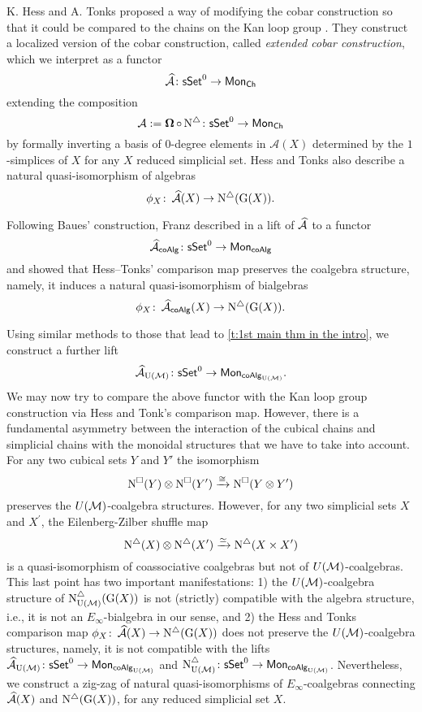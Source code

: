 K. Hess and A. Tonks proposed a way of modifying the cobar construction so that it could be compared to the chains on the Kan loop group \cite{hess2010cobar}.
They construct a localized version of the cobar construction, called \textit{extended cobar construction}, which we interpret as a functor
\[
\operatorname{\mathcal{\widehat{A}}} \colon \mathsf{sSet}^0 \to \mathsf{Mon}_{\mathsf{Ch}}
\]
extending the composition 
\[
\operatorname{\mathcal{A}}:= \operatorname{\mathbf{\Omega}} \circ \operatorname{N^{\triangle}} \colon \mathsf{sSet}^0 \to \mathsf{Mon}_{\mathsf{Ch}}
\]
by formally inverting a basis of $0$-degree elements in $\mathcal{A}(X)$ determined by the $1$-simplices of $X$ for any $X$ reduced simplicial set.
Hess and Tonks also describe a natural quasi-isomorphism of algebras
\begin{equation*}
\phi_X \colon \operatorname{\mathcal{\widehat{A}}}(X) \to \operatorname{N^{\triangle}}(\operatorname{G}(X)).
\end{equation*}


Following Baues’ construction, Franz described in \cite{franz2020szczarba} a lift of $\operatorname{\mathcal{\widehat{A}}}$ to a functor
\begin{equation*}
\operatorname{\mathcal{\widehat{A}}}_{\mathsf{coAlg}} \colon \mathsf{sSet}^0 \to \mathsf{Mon}_{\mathsf{coAlg}}
\end{equation*}
and showed that Hess--Tonks' comparison map preserves the coalgebra structure, namely, it induces a natural quasi-isomorphism of bialgebras
\begin{equation*}
\phi_X \colon \operatorname{\mathcal{\widehat{A}}}_{\mathsf{coAlg}}(X) \to \operatorname{N^{\triangle}} (\operatorname{G}(X)).
\end{equation*}

Using similar methods to those that lead to \cref{t:1st main thm in the intro}, we construct a further lift
\begin{equation*}
\operatorname{\mathcal{\widehat{A}}}_{\operatorname{U}(\mathcal{M})} \colon \mathsf{sSet}^0 \to \mathsf{Mon}_{\mathsf{coAlg}_{\operatorname{U}(\mathcal{M})}}.
\end{equation*}
We may now try to compare the above functor with the Kan loop group construction via Hess and Tonk's comparison map.
However, there is a fundamental asymmetry between the interaction of the cubical chains and simplicial chains with the monoidal structures that we have to take into account.
For any two cubical sets $Y$ and $Y'$ the isomorphism
\begin{equation*}
\operatorname{N^{\square}}(Y) \otimes \operatorname{N^{\square}}(Y') \xrightarrow{\cong} \operatorname{N^{\square}}(Y \otimes Y')
\end{equation*}
preserves the $U(\mathcal{M})$-coalgebra structures.
However, for any two simplicial sets $X$ and $X^\prime$, the Eilenberg-Zilber shuffle map 
\[
\operatorname{N^{\triangle}}(X) \otimes \operatorname{N^{\triangle}}(X^\prime) \xrightarrow{\simeq} \operatorname{N^{\triangle}}(X \times X^\prime)
\]
is a quasi-isomorphism of coassociative coalgebras but not of $U(\mathcal{M})$-coalgebras.
This last point has two important manifestations: 1) the $U(\mathcal{M})$-coalgebra structure of $\operatorname{N^{\triangle}_{{\operatorname{U}(\mathcal{M})}}}(\operatorname{G}(X))$ is not (strictly) compatible with the algebra structure, i.e., it is not an $E_{\infty}$-bialgebra in our sense, and 2) the Hess and Tonks comparison map $\phi_X \colon \operatorname{\mathcal{\widehat{A}}}(X) \to \operatorname{N^{\triangle}}(\operatorname{G}(X))$ does not preserve the $U(\mathcal{M})$-coalgebra structures, namely, it is not compatible with the lifts $\operatorname{\mathcal{\widehat{A}}}_{\operatorname{U}(\mathcal{M})} \colon \mathsf{sSet}^0 \to \mathsf{Mon}_{\mathsf{coAlg}_{\operatorname{U}(\mathcal{M})}}$
and $\operatorname{N^{\triangle}_{{\operatorname{U}(\mathcal{M})}}} \colon \mathsf{sSet}^0 \to \mathsf{Mon}_{\mathsf{coAlg}_{\operatorname{U}(\mathcal{M})}}$.
Nevertheless, we construct a zig-zag of natural quasi-isomorphisms of $E_{\infty}$-coalgebras connecting $\operatorname{\mathcal{\widehat{A}}}(X)$ and $\operatorname{N^{\triangle}}(\operatorname{G}(X))$, for any reduced simplicial set $X$.

